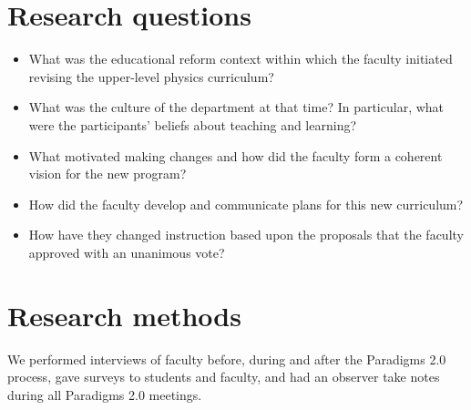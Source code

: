 \documentclass[aps,prstper,reprint]{revtex4-1}
\begin{document}
\section{Research questions}
\begin{itemize}
\item What was the educational reform context within which the faculty
  initiated revising the upper-level physics curriculum?
\item What was the culture of the department at that time? In
  particular, what were the participants' beliefs about teaching and
  learning?
\item What motivated making changes and how did the faculty form a
  coherent vision for the new program?
\item How did the faculty develop and communicate plans for this new
  curriculum?
\item How have they changed instruction based upon the proposals that
  the faculty approved with an unanimous vote?
\end{itemize}
\section{Research methods}
We performed interviews of faculty before, during and after the
Paradigms 2.0 process, gave surveys to students and faculty, and had
an observer take notes during all Paradigms 2.0 meetings.


\end{document}
